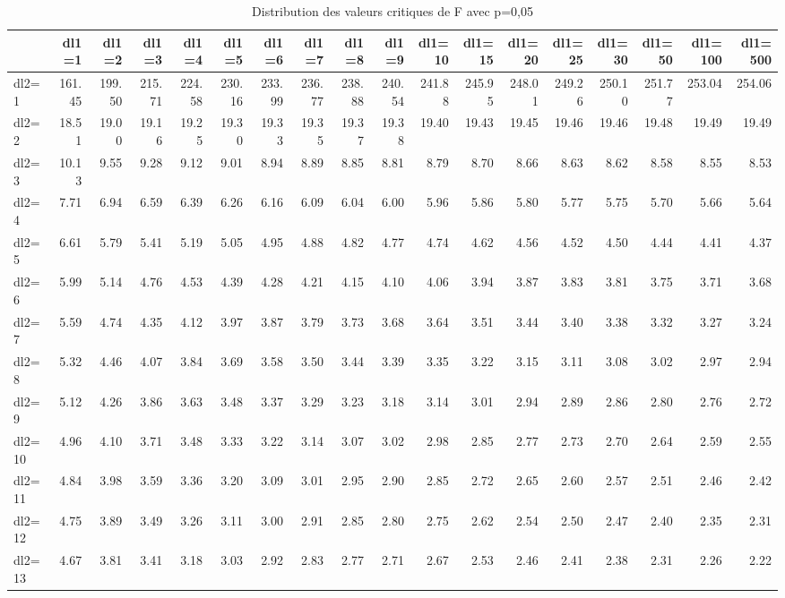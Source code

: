 \documentclass[
  11pt,
  french,
]{book}
\begin{document}
\begin{table}

\caption{\label{tab:tableCritiqueF}Distribution des valeurs critiques de F avec p=0,05}
\centering
\begin{tabular}[t]{lrrrrrrrrrrrrrrrrr}
\toprule
  & dl1=1 & dl1=2 & dl1=3 & dl1=4 & dl1=5 & dl1=6 & dl1=7 & dl1=8 & dl1=9 & dl1=10 & dl1=15 & dl1=20 & dl1=25 & dl1=30 & dl1=50 & dl1=100 & dl1=500\\
\midrule
dl2=1 & 161.45 & 199.50 & 215.71 & 224.58 & 230.16 & 233.99 & 236.77 & 238.88 & 240.54 & 241.88 & 245.95 & 248.01 & 249.26 & 250.10 & 251.77 & 253.04 & 254.06\\
dl2=2 & 18.51 & 19.00 & 19.16 & 19.25 & 19.30 & 19.33 & 19.35 & 19.37 & 19.38 & 19.40 & 19.43 & 19.45 & 19.46 & 19.46 & 19.48 & 19.49 & 19.49\\
dl2=3 & 10.13 & 9.55 & 9.28 & 9.12 & 9.01 & 8.94 & 8.89 & 8.85 & 8.81 & 8.79 & 8.70 & 8.66 & 8.63 & 8.62 & 8.58 & 8.55 & 8.53\\
dl2=4 & 7.71 & 6.94 & 6.59 & 6.39 & 6.26 & 6.16 & 6.09 & 6.04 & 6.00 & 5.96 & 5.86 & 5.80 & 5.77 & 5.75 & 5.70 & 5.66 & 5.64\\
dl2=5 & 6.61 & 5.79 & 5.41 & 5.19 & 5.05 & 4.95 & 4.88 & 4.82 & 4.77 & 4.74 & 4.62 & 4.56 & 4.52 & 4.50 & 4.44 & 4.41 & 4.37\\
\addlinespace
dl2=6 & 5.99 & 5.14 & 4.76 & 4.53 & 4.39 & 4.28 & 4.21 & 4.15 & 4.10 & 4.06 & 3.94 & 3.87 & 3.83 & 3.81 & 3.75 & 3.71 & 3.68\\
dl2=7 & 5.59 & 4.74 & 4.35 & 4.12 & 3.97 & 3.87 & 3.79 & 3.73 & 3.68 & 3.64 & 3.51 & 3.44 & 3.40 & 3.38 & 3.32 & 3.27 & 3.24\\
dl2=8 & 5.32 & 4.46 & 4.07 & 3.84 & 3.69 & 3.58 & 3.50 & 3.44 & 3.39 & 3.35 & 3.22 & 3.15 & 3.11 & 3.08 & 3.02 & 2.97 & 2.94\\
dl2=9 & 5.12 & 4.26 & 3.86 & 3.63 & 3.48 & 3.37 & 3.29 & 3.23 & 3.18 & 3.14 & 3.01 & 2.94 & 2.89 & 2.86 & 2.80 & 2.76 & 2.72\\
dl2=10 & 4.96 & 4.10 & 3.71 & 3.48 & 3.33 & 3.22 & 3.14 & 3.07 & 3.02 & 2.98 & 2.85 & 2.77 & 2.73 & 2.70 & 2.64 & 2.59 & 2.55\\
\addlinespace
dl2=11 & 4.84 & 3.98 & 3.59 & 3.36 & 3.20 & 3.09 & 3.01 & 2.95 & 2.90 & 2.85 & 2.72 & 2.65 & 2.60 & 2.57 & 2.51 & 2.46 & 2.42\\
dl2=12 & 4.75 & 3.89 & 3.49 & 3.26 & 3.11 & 3.00 & 2.91 & 2.85 & 2.80 & 2.75 & 2.62 & 2.54 & 2.50 & 2.47 & 2.40 & 2.35 & 2.31\\
dl2=13 & 4.67 & 3.81 & 3.41 & 3.18 & 3.03 & 2.92 & 2.83 & 2.77 & 2.71 & 2.67 & 2.53 & 2.46 & 2.41 & 2.38 & 2.31 & 2.26 & 2.22\\

\end{tabular}
\end{table}
\end{document}
